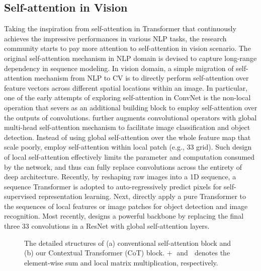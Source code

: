 \documentclass[10pt,twocolumn,letterpaper]{article}
\begin{document}
\subsection{Self-attention in Vision} Taking the inspiration from self-attention in Transformer that continuously achieves the impressive performances in various NLP tasks, the research community starts to pay more attention to self-attention in vision scenario. The original self-attention mechanism in NLP domain \cite{vaswani2017attention} is devised to capture long-range dependency in sequence modeling. In vision domain, a simple migration of self-attention mechanism from NLP to CV is to directly perform self-attention over feature vectors across different spatial locations within an image. In particular, one of the early attempts of exploring self-attention in ConvNet is the non-local operation \cite{wang2018non} that severs as an additional building block to employ self-attention over the outputs of convolutions. \cite{bello2019attention} further augments convolutional operators with global multi-head self-attention mechanism to facilitate image classification and object detection. Instead of using global self-attention over the whole feature map \cite{bello2019attention,wang2018non} that scale poorly, \cite{hu2019local,ramachandran2019stand,zhao2020exploring} employ self-attention within local patch (e.g., 33 grid). Such design of local self-attention effectively limits the parameter and computation consumed by the network, and thus can fully replace convolutions across the entirety of deep architecture. Recently, by reshaping raw images into a 1D sequence, a sequence Transformer \cite{chen2020generative} is adopted to auto-regressively predict pixels for self-supervised representation learning. Next, \cite{carion2020end,dosovitskiy2020image} directly apply a pure Transformer to the sequences of local features or image patches for object detection and image recognition. Most recently, \cite{srinivas2021bottleneck} designs a powerful backbone by replacing the final three 33 convolutions in a ResNet with global self-attention layers.

\begin{figure*}[!tb]
\vspace{-0.1in}
    \vspace{-0.05in}
    \caption{The detailed structures of (a) conventional self-attention block and (b) our Contextual Transformer (CoT) block. \textcircled{+} and  \textcircled{} denotes the element-wise sum and local matrix multiplication, respectively.}
    \label{fig:framework}
    \vspace{-0.2in}
\end{figure*}
\end{document}
